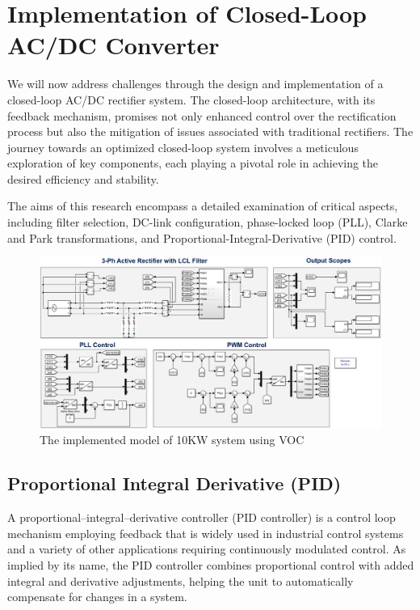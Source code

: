 \documentclass[12pt,a4paper]{book}
\begin{document}
\chapter{Implementation of Closed-Loop AC/DC Converter}
We will now address challenges through the design and implementation of a closed-loop AC/DC rectifier system. The closed-loop architecture, with its feedback mechanism, promises not only enhanced control over the rectification process but also the mitigation of issues associated with traditional rectifiers. The journey towards an optimized closed-loop system involves a meticulous exploration of key components, each playing a pivotal role in achieving the desired efficiency and stability.

The aims of this research encompass a detailed examination of critical aspects, including filter selection, DC-link configuration, phase-locked loop (PLL), Clarke and Park transformations, and Proportional-Integral-Derivative (PID) control. 
\begin{figure}[h]
  \centering
  \includegraphics[width=17cm]{media/image47.jpg}
  \caption{The implemented model of 10KW system using VOC}
  \label{fig:image47}
\end{figure}

\section{Proportional Integral Derivative (PID)}
A proportional–integral–derivative controller (PID controller) is a control loop mechanism employing feedback that is widely used in industrial control systems and a variety of other applications requiring continuously modulated control. As implied by its name, the PID controller combines proportional control with added integral and derivative adjustments, helping the unit to automatically compensate for changes in a system. 
\end{document}
